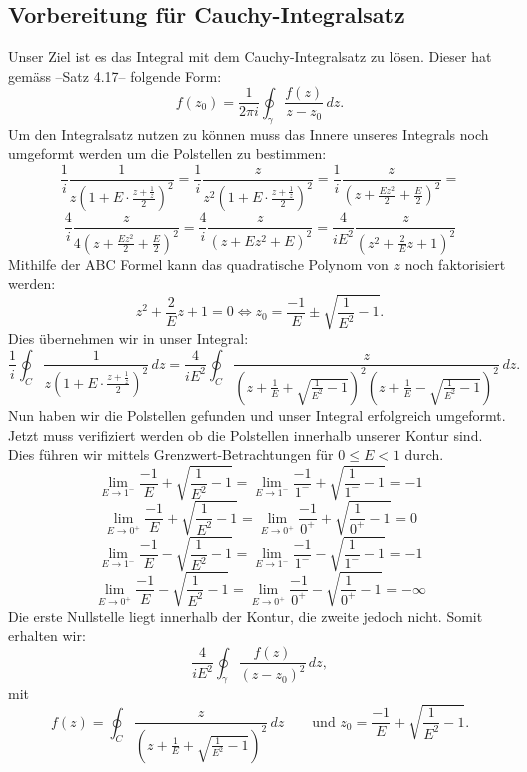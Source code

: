 \subsection{Vorbereitung für Cauchy-Integralsatz}
Unser Ziel ist es das Integral mit dem Cauchy-Integralsatz zu lösen.
Dieser hat gemäss --Satz 4.17-- folgende Form:
\[
f(z_0)
=
\frac{1}{2\pi i}
\oint_{\gamma} \frac{f(z)}{z-z_0}\,dz.
\]
Um den Integralsatz nutzen zu können muss das Innere unseres Integrals noch umgeformt werden um die Polstellen zu bestimmen:
\[
\frac{1}{i}\frac{1}{z(1+E \cdot \frac{z+\frac{1}{z}}{2})^2}
=
\frac{1}{i}\frac{z}{z^2(1+E \cdot \frac{z+\frac{1}{z}}{2})^2}
=
\frac{1}{i}\frac{z}{(z+\frac{Ez^2}{2}+\frac{E}{2})^2}
=
\]
\[
\frac{4}{i}\frac{z}{4(z+\frac{Ez^2}{2}+\frac{E}{2})^2}
=
\frac{4}{i}\frac{z}{(z+Ez^2+E)^2}
=
\frac{4}{iE^2}\frac{z}{(z^2+\frac{2}{E}z+1)^2}
\]
Mithilfe der ABC Formel kann das quadratische Polynom von $z$ noch faktorisiert werden:
\[
z^2+\frac{2}{E}z+1
=
0
\Leftrightarrow
z_0
=
\frac{-1}{E}\pm \sqrt{\frac{1}{E^2}-1}.
\]
Dies übernehmen wir in unser Integral:
\[
\frac{1}{i} \oint_C \frac{1}{z(1+E \cdot \frac{z+\frac{1}{z}}{2})^2}\,dz
=
\frac{4}{iE^2} \oint_C \frac{z}{(z+\frac{1}{E}+\sqrt{\frac{1}{E^2}-1})^2(z+\frac{1}{E}-\sqrt{\frac{1}{E^2}-1})^2}\,dz.
\]
Nun haben wir die Polstellen gefunden und unser Integral erfolgreich umgeformt.
Jetzt muss verifiziert werden ob die Polstellen innerhalb unserer Kontur sind.
Dies führen wir mittels Grenzwert-Betrachtungen für $0 \leq E < 1$ durch.
\[
\lim_{E \to 1^-} \frac{-1}{E}+\sqrt{\frac{1}{E^2}-1}
=
\lim_{E \to 1^-} \frac{-1}{1^-}+\sqrt{\frac{1}{1^-}-1}
=
-1
\]
\[
\lim_{E \to 0^+} \frac{-1}{E}+\sqrt{\frac{1}{E^2}-1}
=
\lim_{E \to 0^+} \frac{-1}{0^+}+\sqrt{\frac{1}{0^+}-1}
=
0
\]
\[
\lim_{E \to 1^-} \frac{-1}{E}-\sqrt{\frac{1}{E^2}-1}
=
\lim_{E \to 1^-} \frac{-1}{1^-}-\sqrt{\frac{1}{1^-}-1}
=
-1
\]
\[
\lim_{E \to 0^+} \frac{-1}{E}-\sqrt{\frac{1}{E^2}-1}
=
\lim_{E \to 0^+} \frac{-1}{0^+}-\sqrt{\frac{1}{0^+}-1}
=
-\infty
\]
Die erste Nullstelle liegt innerhalb der Kontur, die zweite jedoch nicht.
Somit erhalten wir:
\[
\frac{4}{iE^2}
\oint_{\gamma} \frac{f(z)}{(z-z_0)^2}\,dz
,
\]
mit
\[
f(z)
=
\oint_C \frac{z}{(z+\frac{1}{E}+\sqrt{\frac{1}{E^2}-1})^2}\,dz
\qquad
\text{und $z_0=\frac{-1}{E}+\sqrt{\frac{1}{E^2}-1}$.}
\]
